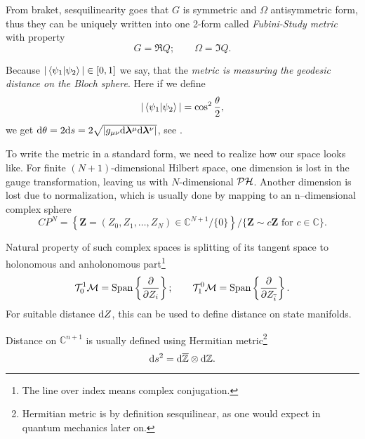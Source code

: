 From braket, sesquilinearity goes that $G$ is symmetric and $\Omega$ antisymmetric form, thus they can be uniquely written into one 2-form called \emph{Fubini-Study metric} with property
\begin{equation}
    G=\Re Q ;\qquad \Omega=\Im Q.
\end{equation}

Because $|\braket{\psi_1|\psi_2}|\in[0,1]$ we say, that the \emph{metric is measuring the geodesic distance on the Bloch sphere}. Here if we define
\begin{equation}
    |\braket{\psi_1|\psi_2}|=\cos^2 \frac{\theta}{2},
\end{equation}
we get $\mathrm{d} \theta= 2\mathrm{d} s=2\sqrt{|g_{\mu\nu}\mathrm{d} {\bm\lambda}^\mu\mathrm{d} {\bm\lambda}^\nu|}$, see \citet{cheng_quantum_2013}.

To write the metric in a standard form, we need to realize how our space looks like. For finite $(N+1)$-dimensional Hilbert space, one dimension is lost in the gauge transformation, leaving us with $N$-dimensional $\mathcal{PH}$. Another dimension is lost due to normalization, which is usually done by mapping to an n--dimensional complex sphere
$$CP^N= \left\{ \bm Z=(Z_0,Z_1,\dots,Z_N)\in \mathbb{C}^{N+1}/\{0\} \right\}\Big/ \{\bm Z\sim c\bm Z \text{ for } c\in \mathbb{C}\}.$$

Natural property of such complex spaces is splitting of its tangent space to holonomous and anholonomous part\footnote{The line over index means complex conjugation.}
$$\mathcal T^1_0\mathcal{M}=\text{Span}\left\{\frac{\partial}{\partial Z_i}\right\}; \qquad \mathcal T^0_1\mathcal{M}=\text{Span}\left\{\frac{\partial}{\partial Z_{\overline{i}}}\right\}.$$
For suitable distance $\mathrm{d} Z$, this can be used to define distance on state manifolds.


Distance on $\mathbb{C}^{n+1}$ is usually defined using Hermitian metric\footnote{Hermitian metric is by definition sesquilinear, as one would expect in quantum mechanics later on.} 
\begin{equation}
    \mathrm{d} s^2 = \mathrm{d} \overline{\mathbb{Z}} \otimes \mathrm{d} \mathbb{Z}.
\label{eq:metricdistancePH}
\end{equation}




